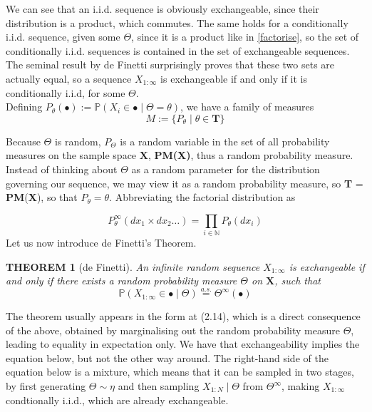 \documentclass[12pt]{report}
\newtheorem{theorem}{THEOREM}
\newcommand{\bs}{\boldsymbol}
\newcommand{\mb}[1]{\mathbb{#1}}
\renewcommand{\bs}{\boldsymbol}
\begin{document}
We can see that an i.i.d. sequence is obviously exchangeable, since their distribution is a product, which commutes. The same holds for a conditionally i.i.d. sequence, given some $\Theta$, since it is a product like in \ref{factorise}, so the set of conditionally i.i.d. sequences is contained in the set of exchangeable sequences. The seminal result by de Finetti surprisingly proves that these two sets are actually equal, so a sequence $X_{1:\infty}$ is exchangeable if and only if it is conditionally i.i.d, for some $\Theta$. \\

Defining $P_\theta(\bullet) := \mb{P}(X_i \in \bullet \mid \Theta = \theta)$, we have a family of measures
\begin{equation}
    M := \{P_\theta \mid \theta \in \bs{T}\}
\end{equation}

Because $\Theta$ is random, $P_\Theta$ is a random variable in the set of all probability measures on the sample space $\bs{X}$, \textbf{PM(X)}, thus a random probability measure. Instead of thinking about $\Theta$ as a random parameter for the distribution governing our sequence, we may view it as a random probability measure, so \textbf{T} = \textbf{PM}(\textbf{X}), so that $P_\theta = \theta$. Abbreviating the factorial distribution as

\begin{equation}
    P_\theta^\infty(dx_1 \times dx_2 \dots) = \prod\limits_{i \in \mb{N}} P_\theta(dx_i)
\end{equation}
Let us now introduce de Finetti's Theorem.

\newpage
\begin{theorem}[de Finetti]
    An infinite random sequence $X_{1:\infty}$ is exchangeable if and only if there exists a random probability measure $\Theta$ on $\bs{X}$, such that
    \begin{equation}
        \mb{P}(X_{1:\infty} \in \bullet \mid \Theta) \overset{a.s.}{=} \Theta^\infty(\bullet)
    \end{equation}
\end{theorem}

The theorem usually appears in the form at (2.14), which is a direct consequence of the above, obtained by marginalising out the random probability measure $\Theta$, leading to equality in expectation only. We have that exchangeability implies the equation below, but not the other way around. The right-hand side of the equation below is a mixture, which means that it can be sampled in two stages, by first generating $\Theta \sim \eta$ and then sampling $X_{1:N} \mid \Theta$ from $\Theta^\infty$, making $X_{1:\infty}$ condtionally i.i.d., which are already exchangeable. \\
\end{document}
